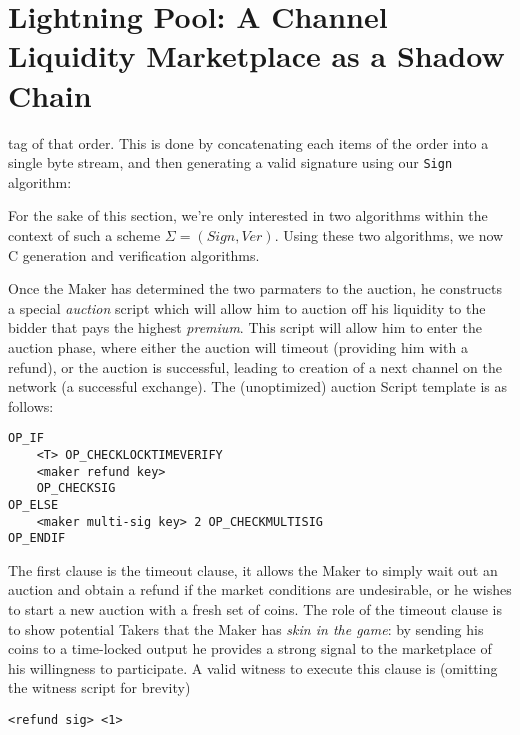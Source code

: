 \documentclass[12pt,a4paper]{article}
\theoremstyle{definition}
\begin{document}





\section{Lightning Pool: A Channel Liquidity Marketplace as a Shadow Chain}

tag of that order. This is done by concatenating each items of the order into
a single byte stream, and then generating a valid signature using our
\texttt{Sign} algorithm:




For the sake of this section, we're only
interested in two algorithms within the context of such a scheme $\Sigma =
(Sign, Ver)$. Using these two algorithms, we now C
generation and verification algorithms.


Once the Maker has determined the two parmaters to the auction, he constructs a special \emph{auction} script which will allow him to auction off his liquidity to the bidder that pays the highest \emph{premium}. This script will allow him to enter the auction phase, where either the auction will timeout (providing him with a refund), or the auction is successful, leading to creation of a next channel on the network (a successful exchange). The (unoptimized) auction Script template is as follows:
\begin{verbatim}
OP_IF
    <T> OP_CHECKLOCKTIMEVERIFY
    <maker refund key>
    OP_CHECKSIG
OP_ELSE
    <maker multi-sig key> 2 OP_CHECKMULTISIG
OP_ENDIF
\end{verbatim}

 The first clause is the timeout clause, it allows the Maker to simply wait out an auction and obtain a refund if the market conditions are undesirable, or he wishes to start a new auction with a fresh set of coins. The role of the timeout clause is to show potential Takers that the Maker has \emph{skin in the game}: by sending his coins to a time-locked output he provides a strong signal to the marketplace of his willingness to participate. A valid witness to execute this clause is (omitting the witness script for brevity)
\begin{verbatim}
<refund sig> <1>
\end{verbatim}
\end{document}
